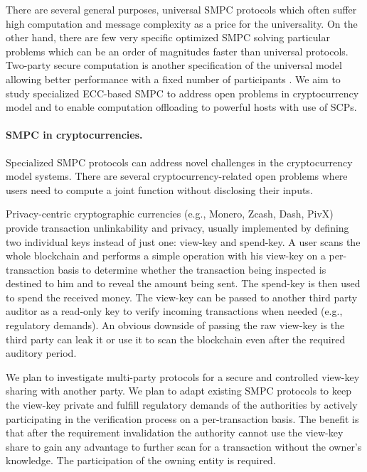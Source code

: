 \documentclass[
  digital, %
  twoside, %
  table,   %
  lof,     %
  lot,     %
]{fithesis3}
\theoremstyle{definition}
\theoremstyle{remark}
\begin{document}
\begin{ecmmnt}
There are several general purposes, universal SMPC protocols which often suffer high computation and message complexity as a price for the universality. On the other hand, there are few very specific optimized SMPC solving particular problems which can be an order of magnitudes faster than universal protocols. Two-party secure computation is another specification of the universal model allowing better performance with a fixed number of participants \cite{Wang:2017:AGE:3133956.3134053}. We aim to study specialized ECC-based SMPC to address open problems in cryptocurrency model and to enable computation offloading to powerful hosts with use of SCPs.

\paragraph{SMPC in cryptocurrencies.} 
Specialized SMPC protocols can address novel challenges in the cryptocurrency model systems. There are several cryptocurrency-related open problems where users need to compute a joint function without disclosing their inputs.

Privacy-centric cryptographic currencies (e.g., Monero, Zcash, Dash, PivX\cite{monero_1098}) provide transaction unlinkability and privacy, usually implemented by defining two individual keys instead of just one: view-key and spend-key. A user scans the whole blockchain and performs a simple operation with his view-key on a per-transaction basis to determine whether the transaction being inspected is destined to him and to reveal the amount being sent. The spend-key is then used to spend the received money.
The view-key can be passed to another third party auditor as a read-only key to verify incoming transactions when needed (e.g., regulatory demands). An obvious downside of passing the raw view-key is the third party can leak it or use it to scan the blockchain even after the required auditory period. 
 
We plan to investigate multi-party protocols for a secure and controlled view-key sharing with another party. We plan to adapt existing SMPC protocols to keep the view-key private and fulfill regulatory demands of the authorities by actively participating in the verification process on a per-transaction basis. The benefit is that after the requirement invalidation the authority cannot use the view-key share to gain any advantage to further scan for a transaction without the owner's knowledge. The participation of the owning entity is required.


\end{ecmmnt}
\end{document}
